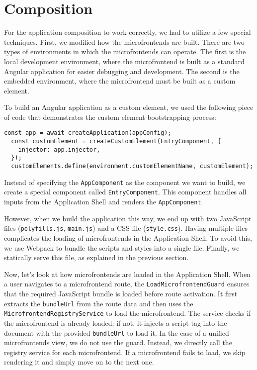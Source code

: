 \section{Composition}
For the application composition to work correctly, we had to utilize a few special techniques. First, we modified how the microfrontends are built. There are two types of environments in which the microfrontends can operate. The first is the local development environment, where the microfrontend is built as a standard Angular application for easier debugging and development. The second is the embedded environment, where the microfrontend must be built as a custom element.

To build an Angular application as a custom element, we used the following piece of code that demonstrates the custom element bootstrapping process:
\begin{lstlisting}[caption={Custom element bootstrapping process in Angular}]
  const app = await createApplication(appConfig);
  const customElement = createCustomElement(EntryComponent, {
    injector: app.injector,
  });
  customElements.define(environment.customElementName, customElement);
\end{lstlisting}
Instead of specifying the \texttt{AppComponent} as the component we want to build, we create a special component called \texttt{EntryComponent}. This component handles all inputs from the Application Shell and renders the \texttt{AppComponent}. 

However, when we build the application this way, we end up with two JavaScript files (\texttt{polyfills.js}, \texttt{main.js}) and a CSS file (\texttt{style.css}). Having multiple files complicates the loading of microfrontends in the Application Shell. To avoid this, we use Webpack to bundle the scripts and styles into a single file. Finally, we statically serve this file, as explained in the previous section.

Now, let's look at how microfrontends are loaded in the Application Shell. When a user navigates to a microfrontend route, the \texttt{LoadMicrofrontendGuard} ensures that the required JavaScript bundle is loaded before route activation. It first extracts the \texttt{bundleUrl} from the route data and then uses the \texttt{MicrofrontendRegistryService} to load the microfrontend. The service checks if the microfrontend is already loaded; if not, it injects a script tag into the document with the provided \texttt{bundleUrl} to load it. In the case of a unified microfrontends view, we do not use the guard. Instead, we directly call the registry service for each microfrontend. If a microfrontend fails to load, we skip rendering it and simply move on to the next one.